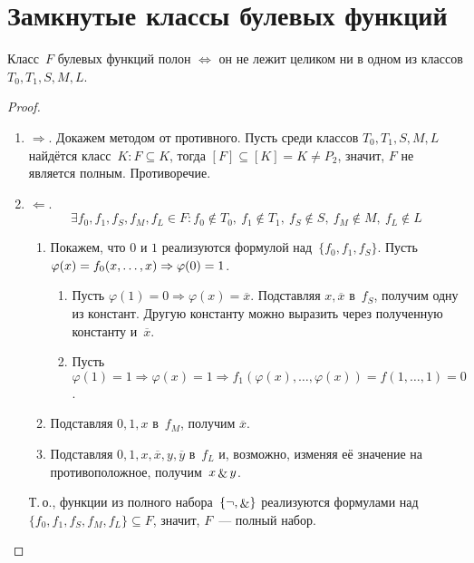 \section{Замкнутые классы булевых функций}
\begin{theorem}
Класс~$F$ булевых функций полон $\Leftrightarrow$ он не лежит целиком ни в одном из классов $T_0, T_1, S, M, L$.
\end{theorem}
\begin{proof}
\begin{enumerate}
	\item $\Rightarrow$. Докажем методом от противного.
	Пусть среди классов $T_0, T_1, S, M, L$ найдётся класс~$K \colon F \subseteq K$, тогда $[F] \subseteq [K] = K \neq P_2$, значит, $F$ не является полным.
	Противоречие.
	
	\item $\Leftarrow$.
	\begin{equation*}
	\exists f_0, f_1, f_S, f_M, f_L \in F \colon
	f_0 \notin T_0, \ f_1 \notin T_1, \ f_S \notin S, \ f_M \notin M, \ f_L \notin L
	\end{equation*}
	\begin{enumerate}
		\item Покажем, что $0$ и $1$ реализуются формулой над~$\{ f_0, f_1, f_S \}$.
		Пусть $\varphi(x) = f_0(x, \ldots, x) \opbr\Rightarrow \varphi(0) = 1$.
		\begin{enumerate}
			\item Пусть $\varphi(1) = 0 \Rightarrow \varphi(x) = \overline x$.
			Подставляя $x, \overline x$ в~$f_S$, получим одну из констант.
			Другую константу можно выразить через полученную константу и~$\overline x$.
			\item Пусть $\varphi(1) = 1 \Rightarrow \varphi(x) = 1 \Rightarrow
			f_1(\varphi(x), \ldots, \varphi(x)) = f(1, \ldots, 1) = 0$.
		\end{enumerate}
		
		\item Подставляя $0, 1, x$ в~$f_M$, получим $\overline x$.
		
		\item Подставляя $0, 1, x, \overline x, y, \overline y$ в~$f_L$ и, возможно, изменяя её значение на противоположное, получим~$x \mathop{\&} y$.
	\end{enumerate}
	
	Т.\,о., функции из полного набора~$\{ \neg, \mathop{\&} \}$ реализуются формулами над~$\{ f_0, f_1, f_S, f_M, f_L \} \subseteq F$, значит, $F$~--- полный набор.
\end{enumerate}
\end{proof}

